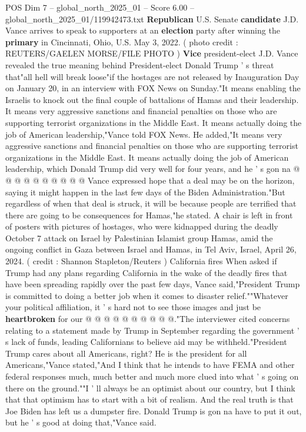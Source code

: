 \begin{textsample}{POS Dim 7 – global\_north\_2025\_01 – Score 6.00 – global\_north\_2025\_01/119942473.txt}  \label{ex:f7_pos_273}
\textbf{Republican} U.S.
Senate \textbf{candidate} J.D.
Vance arrives to speak to supporters at an \textbf{election} party after winning the \textbf{primary} in Cincinnati, Ohio, U.S.
May 3, 2022. ( photo credit : REUTERS/GAELEN MORSE/FILE PHOTO ) \textbf{Vice} president-elect J.D.
Vance revealed the true meaning behind President-elect Donald Trump ' s threat that"all hell will break loose"if the hostages are not released by Inauguration Day on January 20, in an interview with FOX News on Sunday."It means enabling the Israelis to knock out the final couple of battalions of Hamas and their leadership.
It means very aggressive sanctions and financial penalties on those who are supporting terrorist organizations in the Middle East.
It means actually doing the job of American leadership,"Vance told FOX News.
He added,"It means very aggressive sanctions and financial penalties on those who are supporting terrorist organizations in the Middle East.
It means actually doing the job of American leadership, which Donald Trump did very well for four years, and he ' s gon na @ @ @ @ @ @ @ @ @ @ Vance expressed hope that a deal may be on the horizon, saying it might happen in the last few days of the Biden Administration."But regardless of when that deal is struck, it will be because people are terrified that there are going to be consequences for Hamas,"he stated.
A chair is left in front of posters with pictures of hostages, who were kidnapped during the deadly October 7 attack on Israel by Palestinian Islamist group Hamas, amid the ongoing conflict in Gaza between Israel and Hamas, in Tel Aviv, Israel, April 26, 2024. ( credit : Shannon Stapleton/Reuters ) California fires When asked if Trump had any plans regarding California in the wake of the deadly fires that have been spreading rapidly over the past few days, Vance said,"President Trump is committed to doing a better job when it comes to disaster relief.""Whatever your political affiliation, it ' s hard not to see those images and just be \textbf{heartbroken} for our @ @ @ @ @ @ @ @ @ @."The interviewer cited concerns relating to a statement made by Trump in September regarding the government ' s lack of funds, leading Californians to believe aid may be withheld."President Trump cares about all Americans, right?
He is the president for all Americans,"Vance stated,"And I think that he intends to have FEMA and other federal responses much, much better and much more clued into what ' s going on there on the ground.""I ' ll always be an optimist about our country, but I think that that optimism has to start with a bit of realism.
And the real truth is that Joe Biden has left us a dumpster fire.
Donald Trump is gon na have to put it out, but he ' s good at doing that,"Vance said.

\end{textsample}
